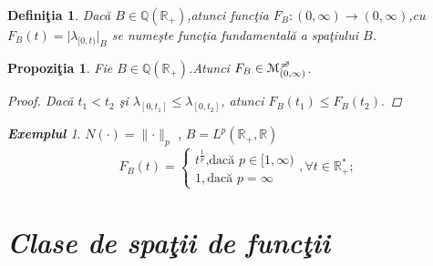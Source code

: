 \documentclass[ a4paper, 12pt]{report}
\newtheorem{prop}[theorem]{\bf Propozi\c tia }
\newtheorem{definition}{\bf Defini\c tia}[section]
\theoremstyle{remark}
\newtheorem{exemple}{\bf Exemplul}[section]
\numberwithin{equation}{section}
\begin{document}
\begin{definition}
Dac\u a $B\in \mathbb{Q}(\mathbb{R}_+)$,atunci func\c tia $F_B : (0,\infty)\rightarrow(0,\infty)$,cu \hspace{5mm} $F_B{(t)} = \lvert \lambda_ {[0,t)} \rvert_B$ se nume\c ste func\c tia fundamental\u a a spa\c tiului $B$.
\end{definition}
\begin{prop}
Fie $B\in \mathbb{Q}(\mathbb{R}_+)$.Atunci $F_B \in \mathcal{M}_{(0,\infty)}^ {\mc} $.
\begin{proof}
Dac\u a $t_1 < t_2$ \c si $\lambda_{[0,t_1]} \leqslant \lambda_{[0,t_2]}$, atunci $F_B{(t_1)}\leqslant F_B{(t_2)}.$
\end{proof}
\end{prop}
\begin{exemple}
$N(\cdot) = \lVert \cdot \rVert_p$ , $B = L^p(\mathbb{R}_+ , \mathbb{R})$\\
\[
F_B{(t)}=
\begin{cases}
t^{\frac{1}{p}} \text{,dac\u a $p \in [1,\infty)$} \\
1 ,\text{dac\u a $p = \infty$}
\end{cases}, \forall  t \in \mathbb{R}_+^{*};
\]
\end{exemple}


\section{\textit{Clase de spa\c tii de func\c tii}}
\end{document}
